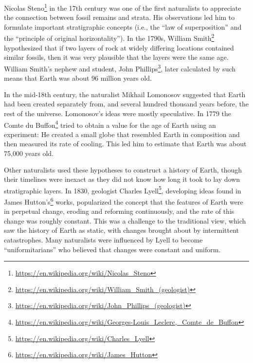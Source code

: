 \documentclass[]{book}
\let\rmarkdownfootnote\footnote%
\def\footnote{\protect\rmarkdownfootnote}
\renewcommand{\href}[2]{#2\footnote{\url{#1}}}
\begin{document}
\href{https://en.wikipedia.org/wiki/Nicolas_Steno}{Nicolas Steno} in the 17th century was one of the first naturalists to appreciate the connection between fossil remains and strata. His observations led him to formulate important stratigraphic concepts (i.e., the ``law of superposition'' and the ``principle of original horizontality''). In the 1790s, \href{https://en.wikipedia.org/wiki/William_Smith_(geologist)}{William Smith} hypothesized that if two layers of rock at widely differing locations contained similar fossils, then it was very plausible that the layers were the same age. William Smith's nephew and student, \href{https://en.wikipedia.org/wiki/John_Phillips_(geologist)}{John Phillips}, later calculated by such means that Earth was about 96 million years old.

In the mid-18th century, the naturalist Mikhail Lomonosov suggested that Earth had been created separately from, and several hundred thousand years before, the rest of the universe. Lomonosov's ideas were mostly speculative. In 1779 the \href{https://en.wikipedia.org/wiki/Georges-Louis_Leclerc,_Comte_de_Buffon}{Comte du Buffon} tried to obtain a value for the age of Earth using an experiment: He created a small globe that resembled Earth in composition and then measured its rate of cooling. This led him to estimate that Earth was about 75,000 years old.

Other naturalists used these hypotheses to construct a history of Earth, though their timelines were inexact as they did not know how long it took to lay down stratigraphic layers. In 1830, geologist \href{https://en.wikipedia.org/wiki/Charles_Lyell}{Charles Lyell}, developing ideas found in \href{https://en.wikipedia.org/wiki/James_Hutton}{James Hutton's} works, popularized the concept that the features of Earth were in perpetual change, eroding and reforming continuously, and the rate of this change was roughly constant. This was a challenge to the traditional view, which saw the history of Earth as static, with changes brought about by intermittent catastrophes. Many naturalists were influenced by Lyell to become ``uniformitarians'' who believed that changes were constant and uniform.
\end{document}
